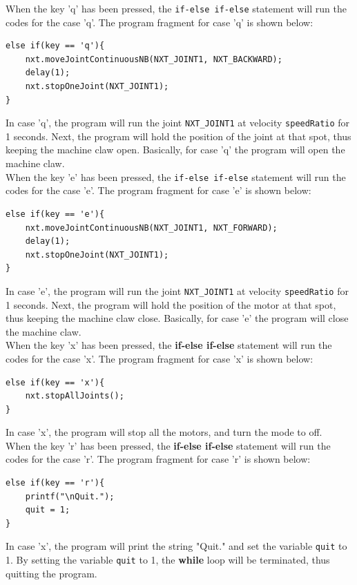 \documentclass[11pt]{article}
\begin{document}
When the key 'q' has been pressed, the \verb+if-else if-else+ statement will run 
the codes for the case 'q'. The program fragment for case 'q' is shown below:
\begin{lstlisting}
else if(key == 'q'){
    nxt.moveJointContinuousNB(NXT_JOINT1, NXT_BACKWARD);
    delay(1);
    nxt.stopOneJoint(NXT_JOINT1);
}
\end{lstlisting}
In case 'q', the program will run the joint {\tt NXT\_JOINT1} at velocity 
{\tt speedRatio} for 1 seconds. Next, the program will hold the position of the 
joint at that spot, thus keeping the machine claw open. Basically, for case 'q' 
the program will open the machine claw.\\

When the key 'e' has been pressed, the {\tt if-else if-else} statement will run 
the codes for the case 'e'. The program fragment for case 'e' is shown below:
\begin{lstlisting}
else if(key == 'e'){
    nxt.moveJointContinuousNB(NXT_JOINT1, NXT_FORWARD);
    delay(1);
    nxt.stopOneJoint(NXT_JOINT1);
}
\end{lstlisting}
In case 'e', the program will run the joint {\tt NXT\_JOINT1} at velocity 
{\tt speedRatio} for 1 seconds. Next, the program will hold the position of the 
motor at that spot, thus keeping the machine claw close. Basically, for case 'e' 
the program will close the machine claw.\\

When the key 'x' has been pressed, the {\bf if-else if-else} statement will run 
the codes for the case 'x'. The program fragment for case 'x' is shown below:
\begin{lstlisting}
else if(key == 'x'){
    nxt.stopAllJoints();
}
\end{lstlisting}
In case 'x', the program will stop all the motors, and turn the mode to off.\\

When the key 'r' has been pressed, the {\bf if-else if-else} statement will run 
the codes for the case 'r'. The program fragment for case 'r' is shown below:
\begin{lstlisting}
else if(key == 'r'){
    printf("\nQuit.");
    quit = 1;
}
\end{lstlisting}
In case 'x', the program will print the string "Quit." and set the variable 
{\tt quit} to 1. By setting the variable {\tt quit} to 1, the {\bf while} loop 
will be terminated, thus quitting the program.
\end{document}
